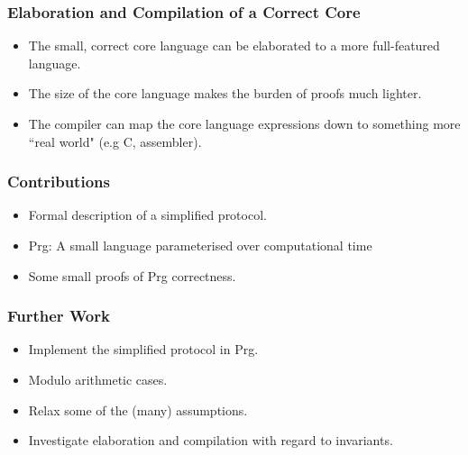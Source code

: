 \documentclass{beamer}
\begin{document}
\begin{frame}[fragile]
  \frametitle{Elaboration and Compilation of a Correct Core}
  \begin{minipage}[c]{5cm}
  \begin{center}
  \end{center}
  \end{minipage}
  \begin{minipage}[c]{\textwidth-6cm}
  \begin{itemize}
    \item The small, correct core language can be elaborated to
          a more full-featured language.
    \item The size of the core language makes the burden of proofs
          much lighter.
    \item The compiler can map the core language expressions down
          to something more ``real world" (e.g C, assembler).
  \end{itemize}
  \end{minipage}
\end{frame}

\begin{frame}[fragile]
  \frametitle{Contributions}
  \begin{itemize}
    \item Formal description of a simplified protocol.
    \item Prg: A small language parameterised over computational 
          time
    \item Some small proofs of Prg correctness.
  \end{itemize}
\end{frame}

\begin{frame}[fragile]
  \frametitle{Further Work}
  \begin{itemize}
    \item Implement the simplified protocol in Prg.
    \item Modulo arithmetic cases.
    \item Relax some of the (many) assumptions.
    \item Investigate elaboration and compilation with regard to 
          invariants.
  \end{itemize}
\end{frame}
\end{document}
